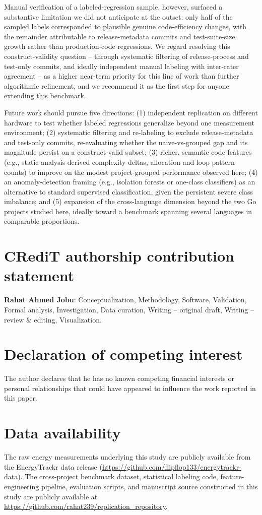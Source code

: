 \documentclass[preprint,12pt]{elsarticle}
\begin{document}
Manual verification of a labeled-regression sample, however, surfaced a substantive limitation we did not anticipate at the outset: only half of the sampled labels corresponded to plausible genuine code-efficiency changes, with the remainder attributable to release-metadata commits and test-suite-size growth rather than production-code regressions. We regard resolving this construct-validity question -- through systematic filtering of release-process and test-only commits, and ideally independent manual labeling with inter-rater agreement -- as a higher near-term priority for this line of work than further algorithmic refinement, and we recommend it as the first step for anyone extending this benchmark.

Future work should pursue five directions: (1) independent replication on different hardware to test whether labeled regressions generalize beyond one measurement environment; (2) systematic filtering and re-labeling to exclude release-metadata and test-only commits, re-evaluating whether the naive-vs-grouped gap and its magnitude persist on a construct-valid subset; (3) richer, semantic code features (e.g., static-analysis-derived complexity deltas, allocation and loop pattern counts) to improve on the modest project-grouped performance observed here; (4) an anomaly-detection framing (e.g., isolation forests or one-class classifiers) as an alternative to standard supervised classification, given the persistent severe class imbalance; and (5) expansion of the cross-language dimension beyond the two Go projects studied here, ideally toward a benchmark spanning several languages in comparable proportions.

\section*{CRediT authorship contribution statement}
\textbf{Rahat Ahmed Jobu}: Conceptualization, Methodology, Software, Validation, Formal analysis, Investigation, Data curation, Writing -- original draft, Writing -- review \& editing, Visualization.

\section*{Declaration of competing interest}
The author declares that he has no known competing financial interests or personal relationships that could have appeared to influence the work reported in this paper.

\section*{Data availability}
The raw energy measurements underlying this study are publicly available from the EnergyTrackr data release (\url{https://github.com/flipflop133/energytrackr-data}). The cross-project benchmark dataset, statistical labeling code, feature-engineering pipeline, evaluation scripts, and manuscript source constructed in this study are publicly available at \url{https://github.com/rahat239/replication_repository}.
\end{document}
